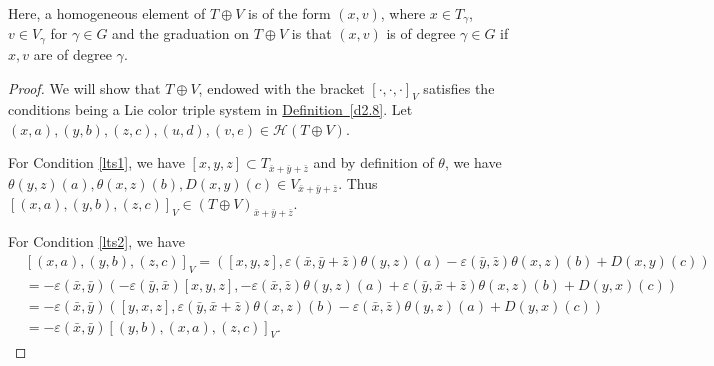 \documentclass[11pt, twoside]{article}
\begin{document}
Here, a homogeneous element of $T\oplus V $ is of the form $(x,v) $, where $x\in T_\gamma$, $v\in V_\gamma$ for $\gamma\in G $ and  the graduation on $T\oplus V $ is that $(x,v) $ is of degree $\gamma \in G$ if $x,v$ are of degree $\gamma $.
\begin{proof}
    We will show that $T\oplus V$, endowed with the bracket $[\cdot,\cdot,\cdot]_V $ satisfies the conditions being a Lie color triple system in \hyperref[d2.8]{Definition~\ref*{d2.8}}. Let $(x,a),(y,b),(z,c),(u,d),(v,e) \in \mathcal{H}(T\oplus V) $.

    For Condition \eqref{lts1}, we have $[x,y,z]\subset T_{\bar{x}+\bar{y}+\bar{z}} $ and by definition of $\theta$, we have \\ $\theta(y,z)(a), \theta(x,z)(b), D(x,y)(c) \in V_{\bar{x}+\bar{y}+\bar{z}} $. Thus  $[(x,a),(y,b),(z,c)]_V\in (T\oplus V)_{\bar{x}+\bar{y}+\bar{z}} $.

    For Condition \eqref{lts2},  we have \begin{align*}
        & [(x,a),(y,b),(z,c)]_V  = ([x,y,z],\varepsilon(\bar{x},\bar{y}+\bar{z})\theta(y,z)(a)- \varepsilon(\bar{y},\bar{z})\theta(x,z)(b)+ D(x,y)(c)) \\ & = -\varepsilon(\bar{x},\bar{y})(-\varepsilon(\bar{y},\bar{x})[x,y,z], -\varepsilon(\bar{x},\bar{z})\theta(y,z)(a)+\varepsilon(\bar{y},\bar{x}+\bar{z})\theta(x,z)(b)+D(y,x)(c)) \\ & = -\varepsilon(\bar{x},\bar{y})([y,x,z],\varepsilon(\bar{y},\bar{x}+\bar{z})\theta(x,z)(b)-\varepsilon(\bar{x},\bar{z})\theta(y,z)(a)+D(y,x)(c)) \\ & = -\varepsilon(\bar{x},\bar{y})[(y,b),(x,a),(z,c)]_V.
    \end{align*}


\end{proof}
\end{document}
